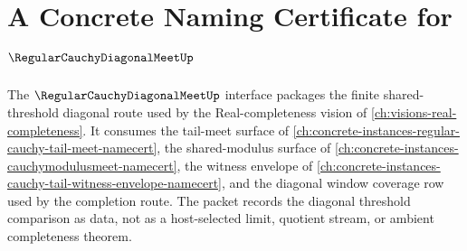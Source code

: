 \chapter{A Concrete Naming Certificate for $\RegularCauchyDiagonalMeetUp$}
\label{ch:concrete-instances-regular-cauchy-diagonal-meet-namecert}

The $\RegularCauchyDiagonalMeetUp$ interface packages the finite shared-threshold diagonal route used by the Real-completeness vision of \autoref{ch:visions-real-completeness}. It consumes the tail-meet surface of \autoref{ch:concrete-instances-regular-cauchy-tail-meet-namecert}, the shared-modulus surface of \autoref{ch:concrete-instances-cauchymodulusmeet-namecert}, the witness envelope of \autoref{ch:concrete-instances-cauchy-tail-witness-envelope-namecert}, and the diagonal window coverage row used by the completion route. The packet records the diagonal threshold comparison as data, not as a host-selected limit, quotient stream, or ambient completeness theorem.

